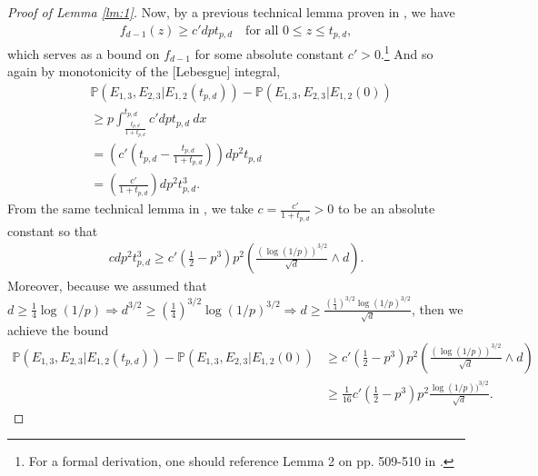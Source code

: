 \documentclass{article}
\begin{document}
\begin{proof}[Proof of Lemma \ref{lm:1}]
Now, by a previous technical lemma proven in \cite{bubeck2016testing}, we have 
\begin{align*}
    f_{d-1}(z) \geq c'dpt_{p,d} \quad \text{for all $0 \leq z \leq t_{p,d}$},
\end{align*}
which serves as a bound on $f_{d-1}$ for some absolute constant $c' > 0$.\footnote{For a formal derivation, one should reference Lemma 2 on pp. 509-510 in \cite{bubeck2016testing}.} And so again by monotonicity of the [Lebesgue] integral, 
\begin{align*}
    & \mathbb{P}(E_{1,3}, E_{2,3} | E_{1,2}(t_{p,d})) - \mathbb{P}(E_{1,3},E_{2,3}| E_{1,2}(0))\\ 
    &\geq p\int_{\frac{t_{p,d}}{1 + t_{p,d}}}^{t_{p,d}} c'dpt_{p,d} \ dx\\
    &= \left(c' \left(t_{p,d} -  \frac{t_{p,d}}{1 + t_{p,d}} \right) \right)dp^2t_{p,d}\\
    &= \left(\frac{c'}{1 + t_{p,d}} \right)dp^2t_{p,d}^3.
\end{align*}
From the same technical lemma in \cite{bubeck2016testing}, we take $c = \frac{c'}{1 + t_{p,d}} > 0$ to be an absolute constant so that
\begin{align*}
    cdp^2t_{p,d}^3 \geq c'\left( \frac{1}{2} - p^3 \right)p^2 \left(\frac{(\log(1/p))^{3/2}}{\sqrt{d}} \wedge d \right).
\end{align*}
Moreover, because we assumed that $d \geq \frac{1}{4} \log(1/p) \Rightarrow d^{3/2} \geq \left( \frac{1}{4} \right)^{3/2} \log(1/p)^{3/2} \Rightarrow d \geq \frac{\left( \frac{1}{4} \right)^{3/2} \log(1/p)^{3/2}}{\sqrt{d}}$, then we achieve the bound
\begin{align}
    \mathbb{P}(E_{1,3}, E_{2,3} | E_{1,2}(t_{p,d})) - \mathbb{P}(E_{1,3},E_{2,3}| E_{1,2}(0)) &\geq c'\left( \frac{1}{2} - p^3 \right)p^2 \left(\frac{(\log(1/p))^{3/2}}{\sqrt{d}} \wedge d \right)  \nonumber \\
    &\geq \frac{1}{16}c'\left( \frac{1}{2} - p^3 \right)p^2 \frac{\log(1/p))^{3/2}}{\sqrt{d}}\label{eq7}.
\end{align}


\end{proof}
\end{document}
